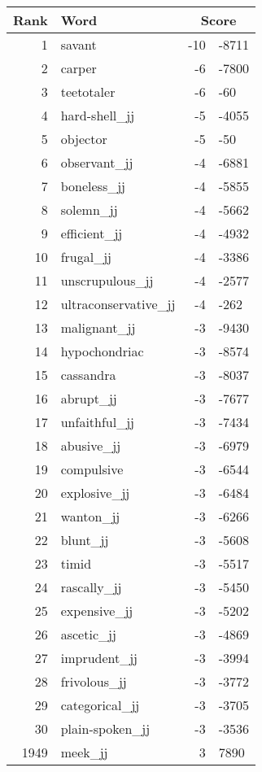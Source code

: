 \begin{longtable}[!htbp]{| rlr@{.}l |}
    \hline
    \textbf{Rank} & \textbf{Word} & \multicolumn{2}{c|}{\textbf{Score}} \\
    \hline
    \endhead
    1 & savant & -10 & -8711 \\
    2 & carper & -6 & -7800 \\
    3 & teetotaler & -6 & -60 \\
    4 & hard-shell\_jj & -5 & -4055 \\
    5 & objector & -5 & -50 \\
    6 & observant\_jj & -4 & -6881 \\
    7 & boneless\_jj & -4 & -5855 \\
    8 & solemn\_jj & -4 & -5662 \\
    9 & efficient\_jj & -4 & -4932 \\
    10 & frugal\_jj & -4 & -3386 \\
    11 & unscrupulous\_jj & -4 & -2577 \\
    12 & ultraconservative\_jj & -4 & -262 \\
    13 & malignant\_jj & -3 & -9430 \\
    14 & hypochondriac & -3 & -8574 \\
    15 & cassandra & -3 & -8037 \\
    16 & abrupt\_jj & -3 & -7677 \\
    17 & unfaithful\_jj & -3 & -7434 \\
    18 & abusive\_jj & -3 & -6979 \\
    19 & compulsive & -3 & -6544 \\
    20 & explosive\_jj & -3 & -6484 \\
    21 & wanton\_jj & -3 & -6266 \\
    22 & blunt\_jj & -3 & -5608 \\
    23 & timid & -3 & -5517 \\
    24 & rascally\_jj & -3 & -5450 \\
    25 & expensive\_jj & -3 & -5202 \\
    26 & ascetic\_jj & -3 & -4869 \\
    27 & imprudent\_jj & -3 & -3994 \\
    28 & frivolous\_jj & -3 & -3772 \\
    29 & categorical\_jj & -3 & -3705 \\
    30 & plain-spoken\_jj & -3 & -3536 \\
    1949 & meek\_jj & 3 & 7890 \\

\end{longtable}
